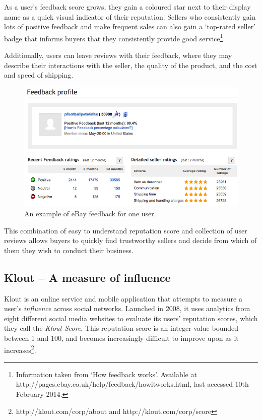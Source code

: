 \documentclass[]{final_report}
\begin{document}
As a user's feedback score grows, they gain a coloured star next to their display name as a quick visual indicator of their reputation. Sellers who consistently gain lots of positive feedback and make frequent sales can also gain a `top-rated seller' badge that informs buyers that they consistently provide good service\footnote{Information taken from `How feedback works'. Available at http://pages.ebay.co.uk/help/feedback/howitworks.html, last accessed 10th February 2014.}.

Additionally, users can leave reviews with their feedback, where they may describe their interactions with the seller, the quality of the product, and the cost and speed of shipping.

\begin{figure}[ht!]
\centering
\includegraphics[width=140mm]{ebayfeedback.PNG}
\caption{An example of eBay feedback for one user.}
\end{figure}

This combination of easy to understand reputation score and collection of user reviews allows buyers to quickly find trustworthy sellers and decide from which of them they wish to conduct their business.

\subsection{Klout -- A measure of influence}

Klout is an online service and mobile application that attempts to measure a user's \textsl{influence} across social networks. Launched in 2008, it uses analytics from eight different social media websites to evaluate its users' reputation scores, which they call the \textsl{Klout Score}. This reputation score is an integer value bounded between 1 and 100, and becomes increasingly difficult to improve upon as it increases\footnote{http://klout.com/corp/about and http://klout.com/corp/score}.
\end{document}
